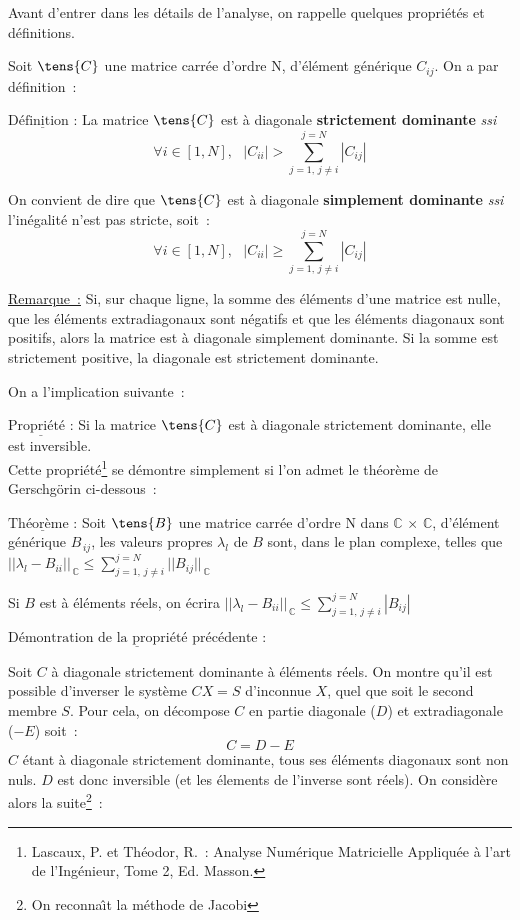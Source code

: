 Avant d'entrer dans les détails de l'analyse, on rappelle quelques
propriétés et définitions.

Soit $\tens{C}$ une matrice carrée d'ordre N,
d'élément générique $C_{ij}$. On a par définition~:

$\underline{\text{Définition~:}}$
La matrice $\tens{C}$ est à diagonale {\bf strictement dominante} {\it ssi}
\begin{equation}\label{Base_Covofi_Eq_Propriete_1}
\forall i \in [1,N],\ \ \ |C_{ii}| > \sum\limits_{j=1,\,j\neq i}^{j=N}|C_{ij}|
\end{equation}

On convient de dire que  $\tens{C}$ est à diagonale {\bf simplement dominante} {\it
ssi} l'inégalité n'est pas stricte, soit~:
\begin{equation}
\forall i \in [1,N],\ \ \ |C_{ii}| \geqslant \sum\limits_{j=1,\,j\neq i}^{j=N}|C_{ij}|
\end{equation}

\underline{Remarque~:} Si, sur chaque ligne, la somme des éléments d'une
matrice est nulle, que les éléments extradiagonaux sont
négatifs et que les éléments diagonaux sont positifs, alors la matrice est
à diagonale simplement dominante. Si la somme est strictement positive, la
diagonale est strictement dominante.

On a l'implication suivante~:

$\underline{\text{Propriété~:}}$
Si la matrice $\tens{C}$ est à diagonale strictement dominante, elle est
inversible. \\

Cette propriété\footnote{Lascaux, P. et Théodor,
R.~: Analyse Numérique Matricielle Appliquée à l'art de l'Ingénieur, Tome 2,
Ed. Masson.} se démontre simplement si l'on admet le théorème de
Gerschg\"orin ci-dessous~:

$\underline{\text{Théorème~:}}$
Soit $\tens{B}$ une matrice carrée d'ordre N dans $\mathbb{C}\,\times\,\mathbb{C}$,
d'élément générique $B_{\,ij}$, les valeurs propres $\lambda_l$ de $B$ sont, dans
le plan complexe, telles que
$||\lambda_l - B_{ii}||_{\,\mathbb{C}} \leqslant \sum\limits_{j=1,\,j\neq
i}^{j=N}{||B_{ij}||_{\,\mathbb{C}}}$

Si $B$ est à éléments réels, on écrira $||\lambda_l - B_{ii}||_{\,\mathbb{C}}
\leqslant \sum\limits_{j=1,\,j\neq i}^{j=N}|B_{ij}|$

$\underline{\text{Démontration de la propriété précédente~:}}$

Soit $C$ à diagonale strictement dominante à éléments réels.
On montre qu'il est possible
d'inverser le système $CX=S$ d'inconnue $X$, quel que soit le second membre
$S$. Pour cela, on décompose $C$ en partie
diagonale ($D$) et extradiagonale ($-E$) soit~:
$$C=D-E$$
$C$ étant à diagonale strictement dominante, tous
ses éléments diagonaux sont non nuls. $D$ est donc inversible (et
les élements de l'inverse sont réels). On
considère alors la suite\footnote{On reconna\^\i t la méthode de Jacobi}~:

